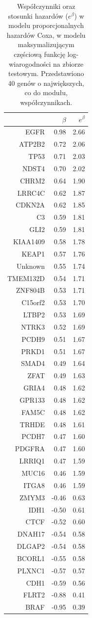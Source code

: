 \begin{table}[ht]
\centering
\begin{tabular}{rrr}
  \toprule
 & $\beta$ & $e^{\beta}$ \\ 
  \toprule
EGFR & 0.98 & 2.66 \\ 
  ATP2B2 & 0.72 & 2.06 \\ 
  TP53 & 0.71 & 2.03 \\ 
  NDST4 & 0.70 & 2.02 \\ 
  CHRM2 & 0.64 & 1.90 \\ 
  LRRC4C & 0.62 & 1.87 \\ 
  CDKN2A & 0.62 & 1.85 \\ 
  C3 & 0.59 & 1.81 \\ 
  GLI2 & 0.59 & 1.81 \\ 
  KIAA1409 & 0.58 & 1.78 \\ 
  KEAP1 & 0.57 & 1.76 \\ 
  Unknown & 0.55 & 1.74 \\ 
  TMEM132D & 0.54 & 1.71 \\ 
  ZNF804B & 0.53 & 1.71 \\ 
  C15orf2 & 0.53 & 1.70 \\ 
  LTBP2 & 0.53 & 1.69 \\ 
  NTRK3 & 0.52 & 1.69 \\ 
  PCDH9 & 0.51 & 1.67 \\ 
  PRKD1 & 0.51 & 1.67 \\ 
  SMAD4 & 0.49 & 1.64 \\ 
  ZFAT & 0.49 & 1.63 \\ 
  GRIA4 & 0.48 & 1.62 \\ 
  GPR133 & 0.48 & 1.62 \\ 
  FAM5C & 0.48 & 1.62 \\ 
  TRHDE & 0.48 & 1.61 \\ 
  PCDH7 & 0.47 & 1.60 \\ 
  PDGFRA & 0.47 & 1.60 \\ 
  LRRIQ1 & 0.47 & 1.59 \\ 
  MUC16 & 0.46 & 1.59 \\ 
  ITGA8 & 0.46 & 1.59 \\ 
  ZMYM3 & -0.46 & 0.63 \\ 
  IDH1 & -0.50 & 0.61 \\ 
  CTCF & -0.52 & 0.60 \\ 
  DNAH17 & -0.54 & 0.58 \\ 
  DLGAP2 & -0.54 & 0.58 \\ 
  BCORL1 & -0.55 & 0.58 \\ 
  PLXNC1 & -0.57 & 0.57 \\ 
  CDH1 & -0.59 & 0.56 \\ 
  FLRT2 & -0.88 & 0.41 \\ 
  BRAF & -0.95 & 0.39 \\ 
   \bottomrule
\end{tabular}
\caption{\label{tabelka}Współczynniki oraz stosunki hazardów ($e^{\beta}$) w modelu proporcjonalnych hazardów Coxa, w modelu maksymalizującym częściową funkcję log-wiarogodności na zbiorze testowym. Przedstawiono 40 genów o największych, co do modułu, współczynnikach.}
\end{table}




